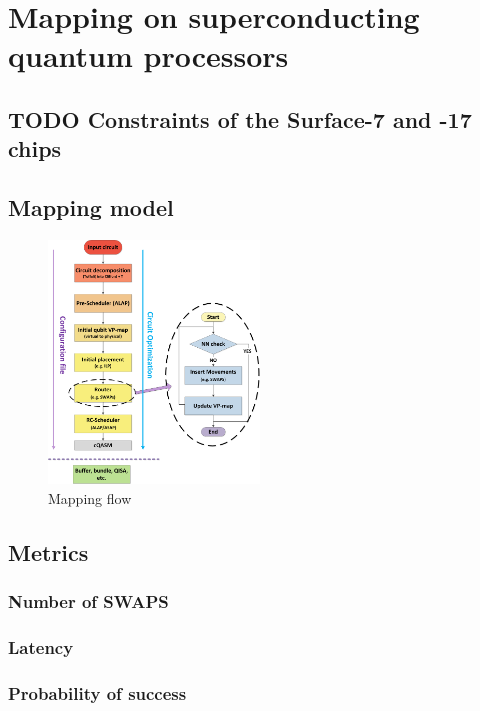 
\chapter*{Mapping on superconducting quantum processors}
\label{sec:orgc8a6148}
\section*{{\bfseries\sffamily TODO} Constraints of the Surface-7 and -17 chips}
\label{sec:orgef2e089}


\section*{Mapping model}
\label{sec:org77c1bad}

\begin{figure}[htbp]
\centering
\includegraphics[width=0.5\textwidth]{figures/mapping_flow2.png}
\caption{\label{fig:orgc91bdd0}
Mapping flow}
\end{figure}

\section*{Metrics}
\label{sec:org986b68a}
\subsection*{Number of SWAPS}
\label{sec:orgae9487e}
\subsection*{Latency}
\label{sec:orgcee3d86}
\subsection*{Probability of success}
\label{sec:orge5b6d39}
